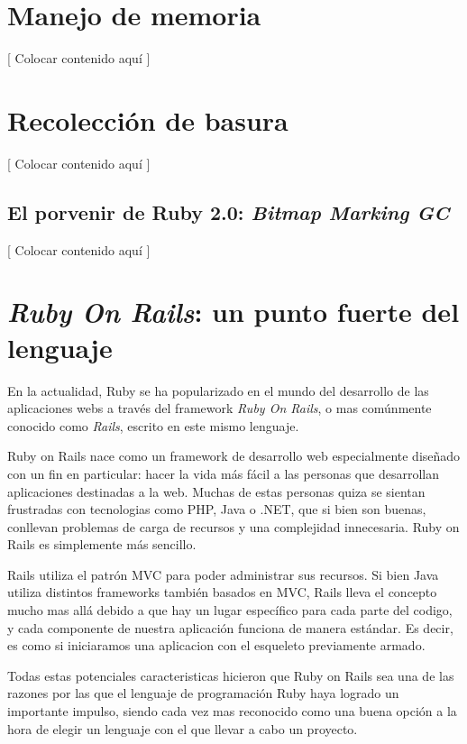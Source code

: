 \documentclass{article}
\begin{document}
 
\bigskip

 
\bigskip

\section{Manejo de memoria}

	[ Colocar contenido aquí ]


\section{Recolección de basura}

	[ Colocar contenido aquí ]



\subsection{El porvenir de Ruby 2.0: \textit{Bitmap Marking GC}}

	[ Colocar contenido aquí ]




\section{\textit{Ruby On Rails}: un punto fuerte del lenguaje}

En la actualidad, Ruby se ha popularizado en el mundo del desarrollo de las aplicaciones webs a través del framework \textit{Ruby On Rails}, o mas comúnmente conocido como \textit{Rails}, escrito en este mismo lenguaje.\par
Ruby on Rails nace como un framework de desarrollo web especialmente diseñado con un fin en particular: hacer la vida más fácil a las personas que desarrollan aplicaciones destinadas a la web. Muchas de estas personas quiza se sientan frustradas con tecnologias como PHP, Java o .NET, que si bien son buenas, conllevan problemas de carga de recursos y una complejidad innecesaria. Ruby on Rails es simplemente más sencillo.\par
 Rails utiliza el patrón MVC para poder administrar sus recursos. Si bien Java utiliza distintos frameworks también basados en MVC, Rails lleva el concepto mucho mas allá debido a que hay un lugar específico para cada parte del codigo, y cada componente de nuestra aplicación funciona de manera estándar. Es decir, es como si iniciaramos una aplicacion con el esqueleto previamente armado.\par
Todas estas potenciales caracteristicas hicieron que Ruby on Rails sea una de las razones por las que el lenguaje de programación Ruby haya logrado un importante impulso, siendo cada vez mas reconocido como una buena opción a la hora de elegir un lenguaje con el que llevar a cabo un proyecto.
\end{document}

